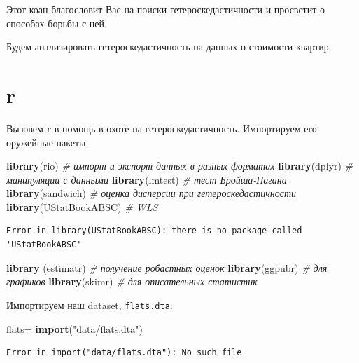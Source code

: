 \documentclass[]{book}
\newenvironment{Shaded}{\begin{snugshade}}{\end{snugshade}}
\newcommand{\CommentTok}[1]{\textcolor[rgb]{0.56,0.35,0.01}{\textit{#1}}}
\newcommand{\KeywordTok}[1]{\textcolor[rgb]{0.13,0.29,0.53}{\textbf{#1}}}
\newcommand{\NormalTok}[1]{#1}
\newcommand{\StringTok}[1]{\textcolor[rgb]{0.31,0.60,0.02}{#1}}
\begin{document}
Этот коан благословит Вас на поиски гетероскедастичности и просветит о способах борьбы с ней.

Будем анализировать гетероскедастичность на данных о стоимости квартир.

\hypertarget{r-3}{%
\section{r}\label{r-3}}

Вызовем \textbf{r} в помощь в охоте на гетероскедастичность. Импортируем его оружейные пакеты.

\begin{Shaded}
\begin{Highlighting}[]
\KeywordTok{library}\NormalTok{(rio) }\CommentTok{# импорт и экспорт данных в разных форматах}
\KeywordTok{library}\NormalTok{(dplyr) }\CommentTok{# манипуляции с данными}
\KeywordTok{library}\NormalTok{(lmtest) }\CommentTok{# тест Бройша-Пагана}
\KeywordTok{library}\NormalTok{(sandwich) }\CommentTok{# оценка дисперсии при гетероскедастичности}
\KeywordTok{library}\NormalTok{(UStatBookABSC) }\CommentTok{# WLS}
\end{Highlighting}
\end{Shaded}

\begin{verbatim}
Error in library(UStatBookABSC): there is no package called 'UStatBookABSC'
\end{verbatim}

\begin{Shaded}
\begin{Highlighting}[]
\KeywordTok{library}\NormalTok{ (estimatr) }\CommentTok{# получение робастных оценок}
\KeywordTok{library}\NormalTok{(ggpubr) }\CommentTok{# для графиков}
\KeywordTok{library}\NormalTok{(skimr) }\CommentTok{# для описательных статистик}
\end{Highlighting}
\end{Shaded}

Импортируем наш dataset, \texttt{flats.dta}:

\begin{Shaded}
\begin{Highlighting}[]
\NormalTok{flats=}\StringTok{ }\KeywordTok{import}\NormalTok{(}\StringTok{"data/flats.dta"}\NormalTok{)}
\end{Highlighting}
\end{Shaded}

\begin{verbatim}
Error in import("data/flats.dta"): No such file
\end{verbatim}
\end{document}
